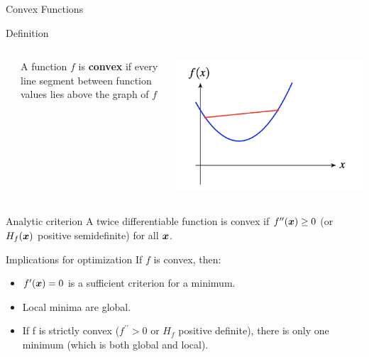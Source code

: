 \documentclass[10pt]{beamer}
\renewcommand{\bf}[1]{\textbf{{#1}}}
\begin{document}
\begin{frame}{Convex Functions}

\begin{sblock}{Definition}
\begin{columns}
\begin{column}{.02\textwidth}
\end{column}
\begin{column}{.68\textwidth}
A function $f$ is \bf{convex} if every line segment between function values lies above the graph of $f$
\end{column}
\begin{column}{.3\textwidth}
\includegraphics[width=\textwidth]{images/convexity}
\end{column}

\end{columns}
\end{sblock}

\begin{sblock}{Analytic criterion}
 A twice differentiable function is convex if $f^{\prime \prime}({\boldsymbol x}) \geq 0$ (or $H_f ({\boldsymbol x})$ positive semidefinite) for all ${\boldsymbol x}$.
\end{sblock}  
  
\begin{sblock}{Implications for optimization}
If $f$ is convex, then:
\begin{itemize}
\item $f^\prime ({\boldsymbol x}) = 0$ is a sufficient criterion for a minimum. 
\item Local minima are global.
\item If f is strictly convex ($f^{\prime \prime} > 0$ or $H_f$ positive definite), there is only one minimum (which is both global and local).
\end{itemize}
\end{sblock}

\end{frame}
\end{document}
